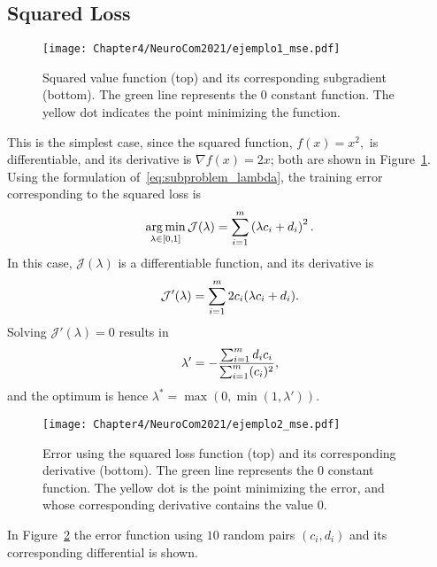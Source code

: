 \subsection{Squared Loss}
\begin{figure}[t!]
    \centering
    \texttt{[image: Chapter4/NeuroCom2021/ejemplo1\_mse.pdf]}
    \caption{Squared value function (top) and its corresponding subgradient (bottom). The green line represents the $0$ constant function. The yellow dot indicates the point minimizing the function.}
    \label{fig:sq_loss}
\end{figure}
This is the simplest case, since the squared function,
$f(x) = x^2 ,$
is differentiable, and its derivative is 
$\nabla f(x) = 2x$; both are shown in Figure~\ref{fig:sq_loss}.
Using the formulation of~\eqref{eq:subproblem_lambda}, the training error corresponding to the squared loss is
\begin{equation}
    \nonumber
    \operatorname*{arg\min}_{\lambda \in [0, 1]} \mathcal{J}(\lambda) = \sum_{i=1}^{m} \left({\lambda c_i + d_i}\right)^2 .
\end{equation}
In this case, $\mathcal{J}(\lambda)$ is a differentiable function, and its derivative is 
\begin{equation}
    \nonumber
    \mathcal{J}'(\lambda) = \sum_{i=1}^m 2 c_i (\lambda c_i + d_i) .
\end{equation}
Solving $\mathcal{J}'(\lambda)= 0$ results in
%
\begin{equation*}
\lambda' =  -\frac{\sum_{i=1}^{m} d_i c_i }{\sum_{i=1}^{m} (c_i)^2 } ,
\end{equation*}
and the optimum is hence $\lambda^* = \max(0, \min(1, \lambda'))$.
\begin{figure}[t!]
    \centering
    \texttt{[image: Chapter4/NeuroCom2021/ejemplo2\_mse.pdf]}
    \caption{Error using the squared loss function (top) and its corresponding derivative (bottom). The green line represents the $0$ constant function. The yellow dot is the point minimizing the error, and whose corresponding derivative contains the value $0$.}
    \label{fig:sq_error}
\end{figure}

In Figure~\ref{fig:sq_error} the error function using $10$ random pairs $(c_i, d_i)$ and its corresponding differential is shown.

